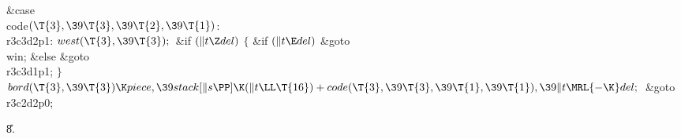 \&{case} \\{code}${}(\T{3},\39\T{3},\39\T{2},\39\T{1}){}$:\5
\\{r3c3d2p1}:\5
${}\\{west}(\T{3},\39\T{3});{}$\6
\&{if} ${}(\|t\Z\\{del}){}$\5
${}\{{}$\5
\1\&{if} ${}(\|t\E\\{del}){}$\1\5
\&{goto} \\{win};\5
\2\&{else}\1\5
\&{goto} \\{r3c3d1p1};\5
\2${}\}{}$\2\6
${}\\{bord}(\T{3},\39\T{3})\K\\{piece},\39\\{stack}[\|s\PP]\K(\|t\LL\T{16})+%
\\{code}(\T{3},\39\T{3},\39\T{1},\39\T{1}),\39\|t\MRL{-{\K}}\\{del};{}$\6
\&{goto} \\{r3c2d2p0};\par
\U8.\fi

